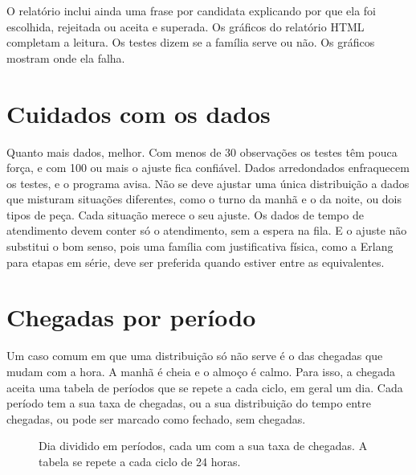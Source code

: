 O relatório inclui ainda uma frase por candidata explicando por que ela foi escolhida, rejeitada ou aceita e superada. Os gráficos do relatório HTML completam a leitura. Os testes dizem se a família serve ou não. Os gráficos mostram onde ela falha.

\section{Cuidados com os dados}

Quanto mais dados, melhor. Com menos de 30 observações os testes têm pouca força, e com 100 ou mais o ajuste fica confiável. Dados arredondados enfraquecem os testes, e o programa avisa. Não se deve ajustar uma única distribuição a dados que misturam situações diferentes, como o turno da manhã e o da noite, ou dois tipos de peça. Cada situação merece o seu ajuste. Os dados de tempo de atendimento devem conter só o atendimento, sem a espera na fila. E o ajuste não substitui o bom senso, pois uma família com justificativa física, como a Erlang para etapas em série, deve ser preferida quando estiver entre as equivalentes.

\section{Chegadas por período}

Um caso comum em que uma distribuição só não serve é o das chegadas que mudam com a hora. A manhã é cheia e o almoço é calmo. Para isso, a chegada aceita uma tabela de períodos que se repete a cada ciclo, em geral um dia. Cada período tem a sua taxa de chegadas, ou a sua distribuição do tempo entre chegadas, ou pode ser marcado como fechado, sem chegadas.

\begin{figure}[ht]
\centering
{}
\caption{Dia dividido em períodos, cada um com a sua taxa de chegadas. A tabela se repete a cada ciclo de 24 horas.}
\label{fig-periodos}
\end{figure}

